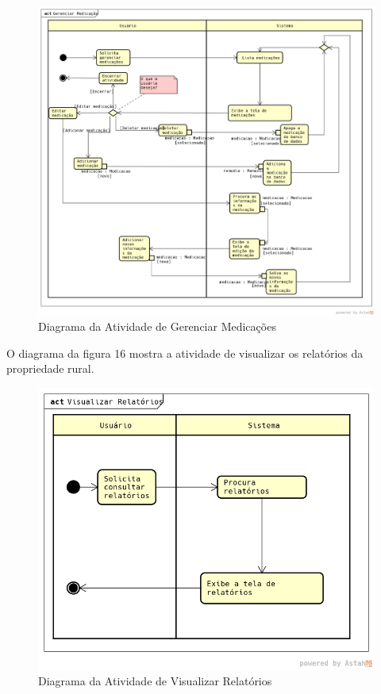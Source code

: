 \documentclass[12pt]{article}
\begin{document}
\begin{titlepage}
\begin{center}
\begin{figure}[!h]
	\begin{center}
		\caption{Diagrama da Atividade de Gerenciar Medicações}
		\includegraphics[width=6in]{img/atividademedicacao.png}

	\end{center}
\end{figure}

\newpage

O diagrama da figura 16 mostra a atividade de visualizar os relatórios da propriedade rural.

\begin{figure}[!h]
	\begin{center}
		\caption{Diagrama da Atividade de Visualizar Relatórios}
		\includegraphics[width=6in]{img/atividaderelatorios.png}


\end{center}
\end{figure}
\end{center}
\end{titlepage}
\end{document}
